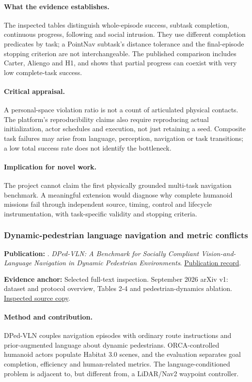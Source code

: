 \paragraph{What the evidence establishes.} The inspected tables distinguish whole-episode success, subtask completion, continuous progress, following and social intrusion. They use different completion predicates by task; a PointNav subtask's distance tolerance and the final-episode stopping criterion are not interchangeable. The published comparison includes Carter, Aliengo and H1, and shows that partial progress can coexist with very low complete-task success.

\paragraph{Critical appraisal.} A personal-space violation ratio is not a count of articulated physical contacts. The platform's reproducibility claims also require reproducing actual initialization, actor schedules and execution, not just retaining a seed. Composite task failures may arise from language, perception, navigation or task transitions; a low total success rate does not identify the bottleneck.

\paragraph{Implication for novel work.} The project cannot claim the first physically grounded multi-task navigation benchmark. A meaningful extension would diagnose why complete humanoid missions fail through independent source, timing, control and lifecycle instrumentation, with task-specific validity and stopping criteria.

\subsubsection{Dynamic-pedestrian language navigation and metric conflicts}\label{paper:dped}
\textbf{Publication:} \citet{dped}. \emph{DPed-VLN: A Benchmark for Socially Compliant Vision-and-Language Navigation in Dynamic Pedestrian Environments}. \href{https://arxiv.org/abs/2609.21504}{Publication record}.

\textbf{Evidence anchor:} Selected full-text inspection. September 2026 arXiv v1: dataset and protocol overview, Tables 2-4 and pedestrian-dynamics ablation. \href{https://arxiv.org/pdf/2609.21504}{Inspected source copy}.

\paragraph{Method and contribution.} DPed-VLN couples navigation episodes with ordinary route instructions and prior-augmented language about dynamic pedestrians. ORCA-controlled humanoid actors populate Habitat 3.0 scenes, and the evaluation separates goal completion, efficiency and human-related metrics. The language-conditioned problem is adjacent to, but different from, a LiDAR/Nav2 waypoint controller.

